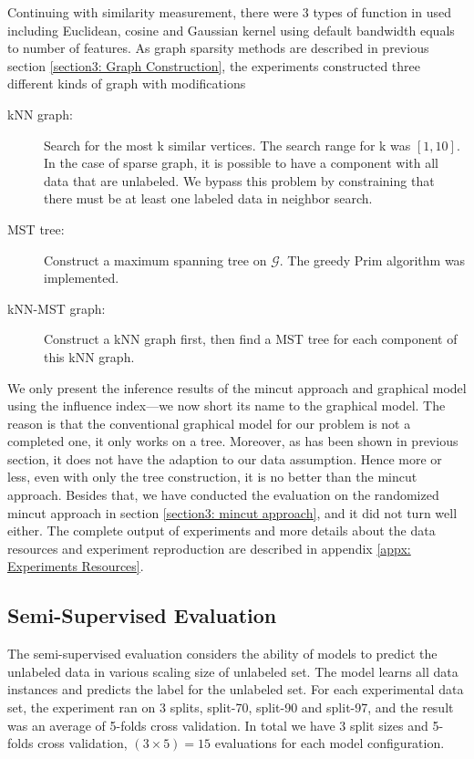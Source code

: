 Continuing with similarity measurement, there were 3 types of function in used including Euclidean, cosine and Gaussian kernel using default bandwidth equals to number of features. As graph sparsity methods are described in previous section \ref{section3: Graph Construction}, the experiments constructed three different kinds of graph with modifications
\begin{description}
	\item[kNN graph:] Search for the most k similar vertices. The search range for k was $[1, 10]$. In the case of sparse graph, it is possible to have a component with all data that are unlabeled. We bypass this problem by constraining that there must be at least one labeled data in neighbor search.
	
	\item[MST tree:] Construct a maximum spanning tree on $\mathcal{G}$. The greedy Prim algorithm \parencite{6773228} was implemented. %
	
	\item[kNN-MST graph:] Construct a kNN graph first, then find a MST tree for each component of this kNN graph.
\end{description}

We only present the inference results of the mincut approach and graphical model using the influence index---we now short its name to the graphical model. The reason is that the conventional graphical model for our problem is not a completed one, it only works on a tree. Moreover, as has been shown in previous section, it does not have the adaption to our data assumption. Hence more or less, even with only the tree construction, it is no better than the mincut approach. Besides that, we have conducted the evaluation on the randomized mincut approach in section \ref{section3: mincut approach}, and it did not turn well either. The complete output of experiments and more details about the data resources and experiment reproduction are described in appendix \ref{appx: Experiments Resources}.

\subsection{Semi-Supervised Evaluation}
\label{subsection: exp ssl}

The semi-supervised evaluation considers the ability of models to predict the unlabeled data in various scaling size of unlabeled set. The model learns all data instances and predicts the label for the unlabeled set. For each experimental data set, the experiment ran on 3 splits, split-70, split-90 and split-97, and the result was an average of 5-folds cross validation. In total we have 3 split sizes and 5-folds cross validation, $(3\times5) = 15$ evaluations for each model configuration.

